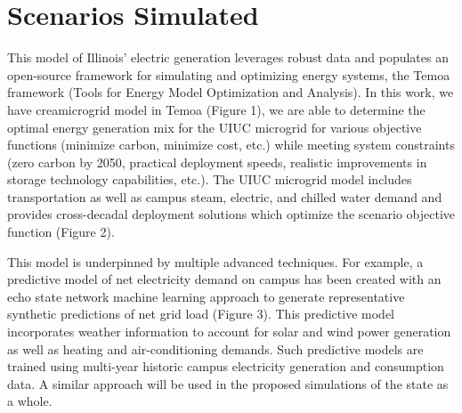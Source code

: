 


\section{Scenarios Simulated}\label{sec:simulations}

This model of Illinois' electric generation leverages robust data and populates 
an open-source framework for simulating and optimizing energy systems, 
the Temoa framework (Tools for Energy Model Optimization and Analysis). In this 
work, we have creamicrogrid model in Temoa (Figure 1), we are able to determine the optimal energy generation mix 
for the UIUC microgrid for various objective functions (minimize carbon, 
minimize cost, etc.) while meeting system constraints (zero carbon by 2050, 
practical deployment speeds, realistic improvements in storage technology 
capabilities, etc.). The UIUC microgrid model includes transportation as well 
as campus steam, electric, and chilled water demand and provides cross-decadal 
deployment solutions which optimize the scenario objective function (Figure 2).

This model is underpinned by multiple advanced techniques. For example, a 
predictive model of net electricity demand on campus has been created with an 
echo state network machine learning approach to generate representative 
synthetic predictions of net grid load (Figure 3). This predictive model 
incorporates weather information to account for solar and wind power generation 
as well as heating and air-conditioning demands. Such predictive models are 
trained using multi-year historic campus electricity generation and consumption 
data. A similar approach will be used in the proposed simulations of the state 
as a whole.




